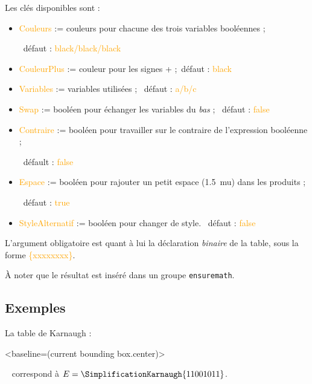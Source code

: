 \documentclass[french,a4paper,11pt]{article}
\newcommand\Cle[1]{{\small\sffamily\textlangle \textcolor{orange}{#1}\textrangle}}
\begin{document}
{{\begin{DemoCode}
\end{DemoCode}

\begin{tipblock}
Les clés disponibles sont :

\begin{itemize}
	\item \Cle{Couleurs} := couleurs pour chacune des trois variables booléennes ;
	
	\hfill~défaut : \Cle{black/black/black}
	\item \Cle{CouleurPlus} := couleur pour les signes + ;\hfill~défaut : \Cle{black}
	\item \Cle{Variables} := variables utilisées ; \hfill~défaut : \Cle{a/b/c}
	\item \Cle{Swap} := booléen pour échanger les variables du \textit{bas} ; \hfill~défaut : \Cle{false}
	\item \Cle{Contraire} := booléen pour travailler sur le contraire de l'expression booléenne ;
	
	\hfill~défault : \Cle{false}
	\item \Cle{Espace} := booléen pour rajouter un petit espace (1.5~mu) dans les produits ;
	
	\hfill~défaut : \Cle{true}
	\item \Cle{StyleAlternatif} := booléen pour changer de style. \hfill~défaut : \Cle{false}
\end{itemize}

L'argument obligatoire est quant à lui la déclaration \textit{binaire} de la table, sous la forme \Cle{\{xxxxxxxx\}}.

\smallskip

À noter que le résultat est inséré dans un groupe \texttt{ensuremath}.
\end{tipblock}

\subsection{Exemples}

\begin{DemoCode}
La table de Karnaugh :
\begin{TableKarnaugh}<baseline=(current bounding box.center)>
\end{TableKarnaugh}~
correspond à $E=\SimplificationKarnaugh{11001011}$.
\end{DemoCode}

}}
\end{document}
